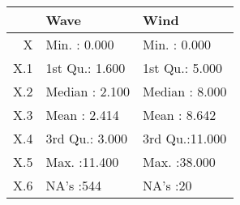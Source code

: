 \begin{tabular}{rll}
  \toprule
 &      Wave &      Wind \\ 
  \midrule
X & Min.   : 0.000   & Min.   : 0.000   \\ 
  X.1 & 1st Qu.: 1.600   & 1st Qu.: 5.000   \\ 
  X.2 & Median : 2.100   & Median : 8.000   \\ 
  X.3 & Mean   : 2.414   & Mean   : 8.642   \\ 
  X.4 & 3rd Qu.: 3.000   & 3rd Qu.:11.000   \\ 
  X.5 & Max.   :11.400   & Max.   :38.000   \\ 
  X.6 & NA's   :544   & NA's   :20   \\ 
   \bottomrule
\end{tabular}
